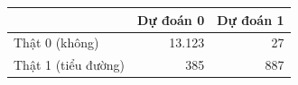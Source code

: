 \begin{tabular}{lrr}
\toprule
 & Dự đoán 0 & Dự đoán 1 \\
\midrule
Thật 0 (không) & 13{.}123 & 27 \\
Thật 1 (tiểu đường) & 385 & 887 \\
\bottomrule
\end{tabular}
